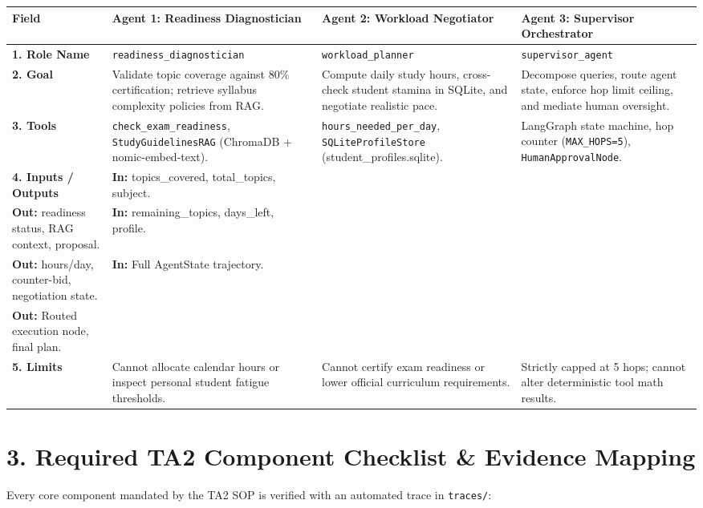 \documentclass[10pt,a4paper]{article}
\begin{document}
\vspace{1pt}
\small
\begin{tabularx}{\textwidth}{@{} p{} X X X @{}}
\toprule
\rowcolor{primary} \textbf{\color{white} Field} & \textbf{\color{white} Agent 1: Readiness Diagnostician} & \textbf{\color{white} Agent 2: Workload Negotiator} & \textbf{\color{white} Agent 3: Supervisor Orchestrator} \\
\midrule
\rowcolor{lightbg} \textbf{1. Role Name} & \texttt{readiness\_diagnostician} & \texttt{workload\_planner} & \texttt{supervisor\_agent} \\
\textbf{2. Goal} & Validate topic coverage against 80\% certification; retrieve syllabus complexity policies from RAG. & Compute daily study hours, cross-check student stamina in SQLite, and negotiate realistic pace. & Decompose queries, route agent state, enforce hop limit ceiling, and mediate human oversight. \\
\rowcolor{lightbg} \textbf{3. Tools} & \texttt{check\_exam\_readiness}, \texttt{StudyGuidelinesRAG} (ChromaDB + nomic-embed-text). & \texttt{hours\_needed\_per\_day}, \texttt{SQLiteProfileStore} (student\_profiles.sqlite). & LangGraph state machine, hop counter (\texttt{MAX\_HOPS=5}), \texttt{HumanApprovalNode}. \\
\textbf{4. Inputs / Outputs} & \textbf{In:} topics\_covered, total\_topics, subject.\\ \textbf{Out:} readiness status, RAG context, proposal. & \textbf{In:} remaining\_topics, days\_left, profile.\\ \textbf{Out:} hours/day, counter-bid, negotiation state. & \textbf{In:} Full AgentState trajectory.\\ \textbf{Out:} Routed execution node, final plan. \\
\rowcolor{lightbg} \textbf{5. Limits} & Cannot allocate calendar hours or inspect personal student fatigue thresholds. & Cannot certify exam readiness or lower official curriculum requirements. & Strictly capped at 5 hops; cannot alter deterministic tool math results. \\
\bottomrule
\end{tabularx}

\clearpage


\section*{\large \color{primary} 3. Required TA2 Component Checklist \& Evidence Mapping}
\vspace{-2pt}
Every core component mandated by the TA2 SOP is verified with an automated trace in \texttt{traces/}:
\end{document}
